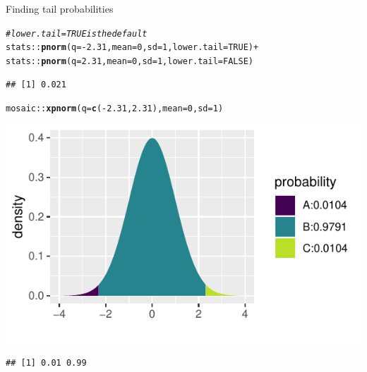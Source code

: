 \documentclass[10pt]{beamer}\usepackage[]{graphicx}\usepackage[]{color}
\makeatletter
\newcommand{\hlnum}[1]{\textcolor[rgb]{0.686,0.059,0.569}{#1}}%
\newcommand{\hlcom}[1]{\textcolor[rgb]{0.678,0.584,0.686}{\textit{#1}}}%
\newcommand{\hlopt}[1]{\textcolor[rgb]{0,0,0}{#1}}%
\newcommand{\hlstd}[1]{\textcolor[rgb]{0.345,0.345,0.345}{#1}}%
\newcommand{\hlkwc}[1]{\textcolor[rgb]{0.333,0.667,0.333}{#1}}%
\newcommand{\hlkwd}[1]{\textcolor[rgb]{0.737,0.353,0.396}{\textbf{#1}}}%
\newenvironment{kframe}{%
 \def\at@end@of@kframe{}%
 \ifinner\ifhmode%
  \def\at@end@of@kframe{\end{minipage}}%
  \begin{minipage}{\columnwidth}%
 \fi\fi%
 \def\FrameCommand##1{\hskip\@totalleftmargin \hskip-\fboxsep
 \colorbox{shadecolor}{##1}\hskip-\fboxsep
     \hskip-\linewidth \hskip-\@totalleftmargin \hskip\columnwidth}%
 \MakeFramed {\advance\hsize-\width
   \@totalleftmargin\z@ \linewidth\hsize
   \@setminipage}}%
 {\par\unskip\endMakeFramed%
 \at@end@of@kframe}
\newenvironment{knitrout}{}{} %
\makeatother
\begin{document}
\begin{frame}[fragile]{Finding tail probabilities}
	
	
	
\begin{knitrout}\tiny
{}\color{fgcolor}\begin{kframe}
\begin{alltt}
\hlcom{# lower.tail = TRUE is the default}
\hlstd{stats}\hlopt{::}\hlkwd{pnorm}\hlstd{(}\hlkwc{q} \hlstd{=} \hlopt{-}\hlnum{2.31}\hlstd{,} \hlkwc{mean} \hlstd{=} \hlnum{0}\hlstd{,} \hlkwc{sd} \hlstd{=} \hlnum{1}\hlstd{,} \hlkwc{lower.tail} \hlstd{=} \hlnum{TRUE}\hlstd{)} \hlopt{+}
\hlstd{stats}\hlopt{::}\hlkwd{pnorm}\hlstd{(}\hlkwc{q} \hlstd{=} \hlnum{2.31}\hlstd{,} \hlkwc{mean} \hlstd{=} \hlnum{0}\hlstd{,} \hlkwc{sd} \hlstd{=} \hlnum{1}\hlstd{,} \hlkwc{lower.tail} \hlstd{=} \hlnum{FALSE}\hlstd{)}
\end{alltt}
\begin{verbatim}
## [1] 0.021
\end{verbatim}
\end{kframe}
\end{knitrout}
	
	\pause 
	
\begin{knitrout}\tiny
{}\color{fgcolor}\begin{kframe}
\begin{alltt}
\hlstd{mosaic}\hlopt{::}\hlkwd{xpnorm}\hlstd{(}\hlkwc{q} \hlstd{=} \hlkwd{c}\hlstd{(}\hlopt{-}\hlnum{2.31}\hlstd{,}\hlnum{2.31}\hlstd{),} \hlkwc{mean} \hlstd{=} \hlnum{0}\hlstd{,} \hlkwc{sd} \hlstd{=} \hlnum{1}\hlstd{)}
\end{alltt}
\end{kframe}

{\centering \includegraphics[width=0.6\linewidth]{figure/probs7-1} 

}


\begin{kframe}\begin{verbatim}
## [1] 0.01 0.99
\end{verbatim}
\end{kframe}
\end{knitrout}
	
	
\end{frame}
\end{document}
